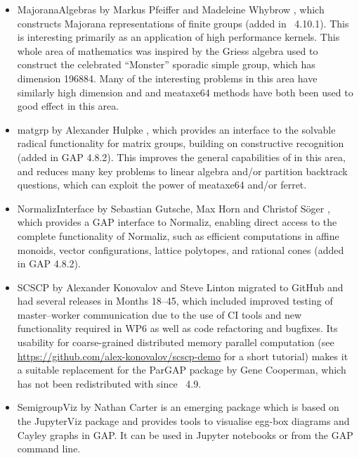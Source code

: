 \begin{itemize}
\item
{\sf MajoranaAlgebras} by Markus Pfeiffer and Madeleine Whybrow \cite{MajoranaAlgebras}, which
constructs Majorana representations of finite groups (added in
\GAP~4.10.1). This is interesting primarily as an application of high
performance kernels. This whole area of mathematics was inspired by
the Griess algebra used to construct the celebrated ``Monster''
sporadic simple group, which has dimension 196884. Many of the
interesting problems in this area have similarly high dimension and
\HPCGAP and meataxe64 methods have both been used to good effect in
this area.
%
%

\item
{\sf matgrp}  by Alexander Hulpke \cite{matgrp}, which provides an interface
to the solvable radical functionality for matrix groups, building on
constructive recognition (added in GAP 4.8.2). This improves the
general capabilities of \GAP in this area, and reduces many key
problems to linear algebra and/or partition backtrack questions, which
can exploit the power of {\sf meataxe64} and/or {\sf ferret}.

\item
{\sf NormalizInterface} by Sebastian Gutsche, Max Horn and
Christof S\"oger \cite{NormalizInterface}, which provides a GAP interface to Normaliz, enabling
direct access to the complete functionality of Normaliz, such as efficient
computations in affine monoids, vector configurations, lattice
polytopes, and rational cones (added in GAP 4.8.2). 

\item
{\sf SCSCP} by Alexander Konovalov and Steve Linton \cite{SCSCP}
migrated to GitHub and had several releases
in Months 18--45, which included improved testing of 
master--worker communication due to the use of
CI tools and new functionality required in WP6 as well as
code refactoring and bugfixes. Its usability for 
coarse-grained distributed memory parallel computation
(see \url{https://github.com/alex-konovalov/scscp-demo}
for a short tutorial) makes it a suitable replacement for the {\sf ParGAP}
package by Gene Cooperman, which has not been redistributed 
with \GAP since \GAP~4.9.

\item
{\sf SemigroupViz} by Nathan Carter \cite{SemigroupViz} is an emerging
package which is based on the {\sf JupyterViz} package \cite{JupyterViz}
and provides tools to visualise egg-box diagrams and Cayley graphs in
GAP. It can be used in Jupyter notebooks or from the GAP command line.



\end{itemize}
